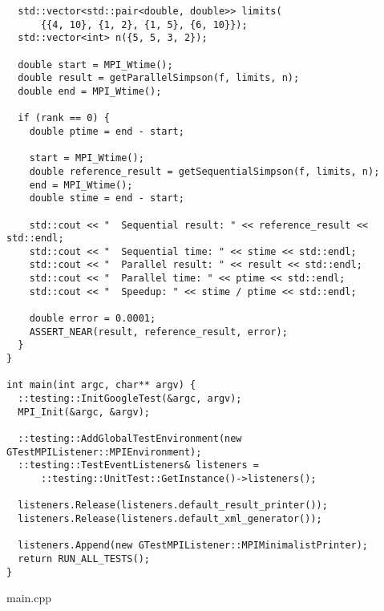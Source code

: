 \documentclass{report}
\begin{document}
\begin{lstlisting}
  std::vector<std::pair<double, double>> limits(
      {{4, 10}, {1, 2}, {1, 5}, {6, 10}});
  std::vector<int> n({5, 5, 3, 2});

  double start = MPI_Wtime();
  double result = getParallelSimpson(f, limits, n);
  double end = MPI_Wtime();

  if (rank == 0) {
    double ptime = end - start;

    start = MPI_Wtime();
    double reference_result = getSequentialSimpson(f, limits, n);
    end = MPI_Wtime();
    double stime = end - start;

    std::cout << "  Sequential result: " << reference_result << std::endl;
    std::cout << "  Sequential time: " << stime << std::endl;
    std::cout << "  Parallel result: " << result << std::endl;
    std::cout << "  Parallel time: " << ptime << std::endl;
    std::cout << "  Speedup: " << stime / ptime << std::endl;

    double error = 0.0001;
    ASSERT_NEAR(result, reference_result, error);
  }
}

int main(int argc, char** argv) {
  ::testing::InitGoogleTest(&argc, argv);
  MPI_Init(&argc, &argv);

  ::testing::AddGlobalTestEnvironment(new GTestMPIListener::MPIEnvironment);
  ::testing::TestEventListeners& listeners =
      ::testing::UnitTest::GetInstance()->listeners();

  listeners.Release(listeners.default_result_printer());
  listeners.Release(listeners.default_xml_generator());

  listeners.Append(new GTestMPIListener::MPIMinimalistPrinter);
  return RUN_ALL_TESTS();
}
\end{lstlisting}
main.cpp
\end{document}
